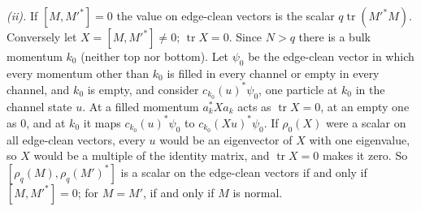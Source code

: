 \emph{(ii).} If $[M, M'^{*}] = 0$ the value on edge-clean vectors is the scalar $q\operatorname{tr}(M'^{*}M)$. Conversely let $X = [M, M'^{*}] \ne 0$; $\operatorname{tr}X = 0$. Since $N > q$ there is a bulk momentum $k_{0}$ (neither top nor bottom). Let $\psi_{0}$ be the edge-clean vector in which every momentum other than $k_{0}$ is filled in every channel or empty in every channel, and $k_{0}$ is empty, and consider $c_{k_{0}}(u)^{*}\psi_{0}$, one particle at $k_{0}$ in the channel state $u$. At a filled momentum $a_{k}^{*}Xa_{k}$ acts as $\operatorname{tr}X = 0$, at an empty one as $0$, and at $k_{0}$ it maps $c_{k_{0}}(u)^{*}\psi_{0}$ to $c_{k_{0}}(Xu)^{*}\psi_{0}$. If $\rho_{0}(X)$ were a scalar on all edge-clean vectors, every $u$ would be an eigenvector of $X$ with one eigenvalue, so $X$ would be a multiple of the identity matrix, and $\operatorname{tr}X = 0$ makes it zero. So $[\rho_{q}(M), \rho_{q}(M')^{*}]$ is a scalar on the edge-clean vectors if and only if $[M, M'^{*}] = 0$; for $M = M'$, if and only if $M$ is normal.

